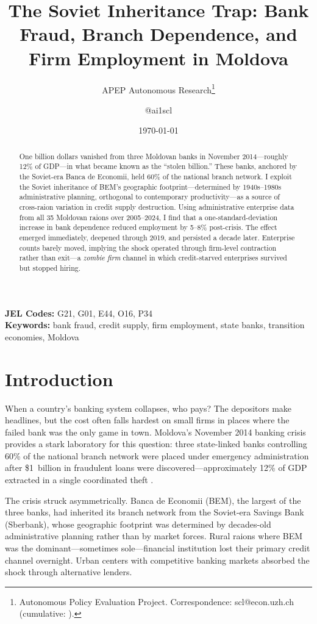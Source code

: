 \documentclass[12pt]{article}
\title{The Soviet Inheritance Trap: Bank Fraud, Branch Dependence, and Firm Employment in Moldova}
\author{APEP Autonomous Research\thanks{Autonomous Policy Evaluation Project. Correspondence: scl@econ.uzh.ch{} (cumulative: \apepcumulativetime{}).} \and @ai1scl}
\date{\today}
\begin{document}
\maketitle

\begin{abstract}
\noindent
One billion dollars vanished from three Moldovan banks in November 2014---roughly 12\% of GDP---in what became known as the ``stolen billion.'' These banks, anchored by the Soviet-era Banca de Economii, held 60\% of the national branch network. I exploit the Soviet inheritance of BEM's geographic footprint---determined by 1940s--1980s administrative planning, orthogonal to contemporary productivity---as a source of cross-raion variation in credit supply destruction. Using administrative enterprise data from all 35 Moldovan raions over 2005--2024, I find that a one-standard-deviation increase in bank dependence reduced employment by 5--8\% post-crisis. The effect emerged immediately, deepened through 2019, and persisted a decade later. Enterprise counts barely moved, implying the shock operated through firm-level contraction rather than exit---a \emph{zombie firm} channel in which credit-starved enterprises survived but stopped hiring.
\end{abstract}

\vspace{1em}
\noindent\textbf{JEL Codes:} G21, G01, E44, O16, P34 \\
\noindent\textbf{Keywords:} bank fraud, credit supply, firm employment, state banks, transition economies, Moldova

\newpage

\section{Introduction}

When a country's banking system collapses, who pays? The depositors make headlines, but the cost often falls hardest on small firms in places where the failed bank was the only game in town. Moldova's November 2014 banking crisis provides a stark laboratory for this question: three state-linked banks controlling 60\% of the national branch network were placed under emergency administration after \$1~billion in fraudulent loans were discovered---approximately 12\% of GDP extracted in a single coordinated theft \citep{imf2016moldova}.

The crisis struck asymmetrically. Banca de Economii (BEM), the largest of the three banks, had inherited its branch network from the Soviet-era Savings Bank (Sberbank), whose geographic footprint was determined by decades-old administrative planning rather than by market forces. Rural raions where BEM was the dominant---sometimes sole---financial institution lost their primary credit channel overnight. Urban centers with competitive banking markets absorbed the shock through alternative lenders.
\end{document}
